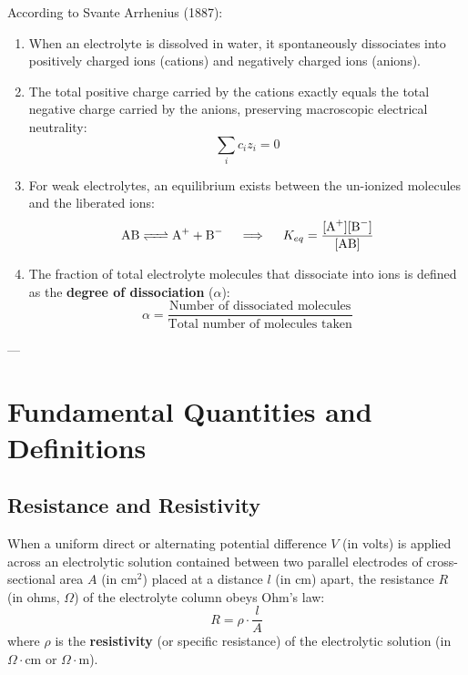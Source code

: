 \begin{conceptbox}
According to Svante Arrhenius (1887):
\begin{enumerate}[leftmargin=*]
    \item When an electrolyte is dissolved in water, it spontaneously dissociates into positively charged ions (cations) and negatively charged ions (anions).
    \item The total positive charge carried by the cations exactly equals the total negative charge carried by the anions, preserving macroscopic electrical neutrality:
    \begin{equation}
        \sum_{i} c_i z_i = 0
    \end{equation}
    \item For weak electrolytes, an equilibrium exists between the un-ionized molecules and the liberated ions:
    \begin{equation}
        \ce{AB <=> A+ + B-} \quad \implies \quad K_{eq} = \frac{[\ce{A+}][\ce{B-}]}{[\ce{AB}]}
    \end{equation}
    \item The fraction of total electrolyte molecules that dissociate into ions is defined as the \textbf{degree of dissociation} ($\alpha$):
    \begin{equation}
        \alpha = \frac{\text{Number of dissociated molecules}}{\text{Total number of molecules taken}}
    \end{equation}
\end{enumerate}
\end{conceptbox}

---

\section{Fundamental Quantities and Definitions}

\subsection{Resistance and Resistivity}
When a uniform direct or alternating potential difference $V$ (in volts) is applied across an electrolytic solution contained between two parallel electrodes of cross-sectional area $A$ (in $\text{cm}^2$) placed at a distance $l$ (in $\text{cm}$) apart, the resistance $R$ (in ohms, $\Omega$) of the electrolyte column obeys Ohm's law:
\begin{equation}
    R = \rho \cdot \frac{l}{A}
\end{equation}
where $\rho$ is the \textbf{resistivity} (or specific resistance) of the electrolytic solution (in $\Omega\cdot\text{cm}$ or $\Omega\cdot\text{m}$).

